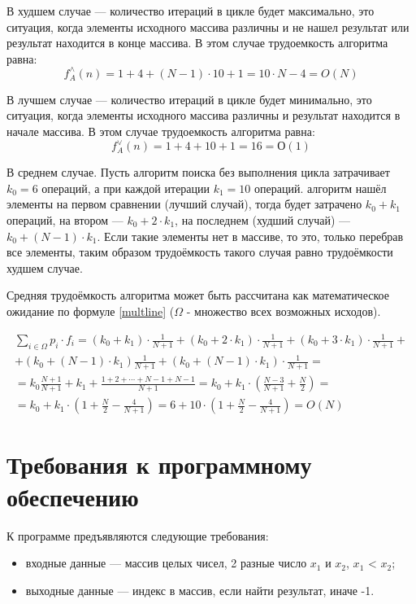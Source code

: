 В худшем случае --- количество итераций в цикле будет максимально, это ситуация, когда элементы исходного массива различны и не нашел результат или результат находится в конце массива. 
В этом случае трудоемкость алгоритма равна:
\begin{equation}
	\label{for:m1}
	{f^\wedge_{A}}(n) = 1 + 4 + (N - 1) \cdot 10 + 1 = 10 \cdot N - 4 = O(N)
\end{equation}

В лучшем случае --- количество итераций в цикле будет минимально, это ситуация, когда элементы исходного массива различны и результат находится в начале массива. 
В этом случае трудоемкость алгоритма равна:
\begin{equation}
	\label{for:m2}
	{f^\vee_{A}}(n) = 1 + 4 + 10 + 1 = 16 = О(1)
\end{equation}

В среднем случае. Пусть алгоритм поиска без выполнения цикла затрачивает $k_0 = 6$ операций, а при каждой итерации $k_1 = 10$ операций. алгоритм нашёл элементы на первом сравнении (лучший случай), тогда будет затрачено $k_0 + k_1$ операций, на втором --- $k_0 + 2\cdot k_1$, на последнем (худший случай) --- $k_0 + (N - 1) \cdot k_1$. Если такие элементы нет в массиве, то это, только перебрав все элементы, таким образом трудоёмкость такого случая равно трудоёмкости худшем случае.

Средняя трудоёмкость алгоритма может быть рассчитана как математическое ожидание по формуле \ref{multline} ($\Omega$ - множество всех возможных исходов).

\begin{multline}
	\label{multline}
	\sum\limits_{i \in \Omega} p_i \cdot f_i = (k_0 + k_1) \cdot \frac{1}{N + 1} + (k_0 + 2 \cdot k_1) \cdot \frac{1}{N+1} + (k_0 + 3 \cdot k_1) \cdot \frac{1}{N + 1} + \\+ (k_0 + (N - 1) \cdot k_1)\frac{1}{N + 1} + (k_0 + (N - 1) \cdot k_1) \cdot \frac{1}{N + 1} = \\= k_0\frac{N+1}{N+1}+k_1+\frac{1 + 2 + \cdots + N - 1 + N - 1}{N + 1} = k_0 + k_1 \cdot \left(\frac{N - 3}{N + 1} + \frac{N}{2}\right) =\\= k_0 + k_1 \cdot \left(1 + \frac{N}{2} - \frac{4}{N + 1}\right) = 6 + 10 \cdot \left(1 + \frac{N}{2} - \frac{4}{N + 1}\right) = O(N)
\end{multline}

\section{Требования к программному обеспечению}
К программе предъявляются следующие требования:
\begin{itemize}
	\item входные данные --- массив целых чисел, 2 разные число $x_1$ и $x_2$, $x_1$ < $x_2$;
	\item выходные данные --- индекс в массив, если найти результат, иначе -1.
\end{itemize}

